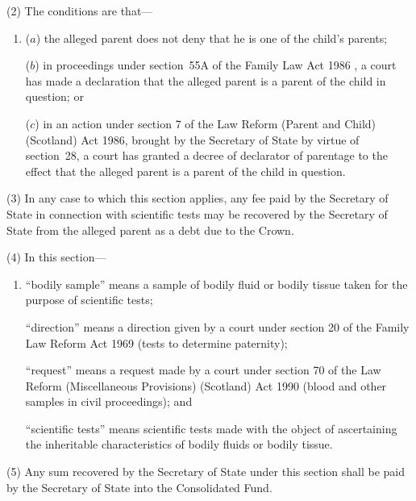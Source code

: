 \documentclass[12pt,a4paper]{article}
\begin{document}
(2) The conditions are that—
\begin{enumerate}\item[]
($a$) the alleged parent does not deny that he is one of the child’s parents;

($b$) in proceedings under 
section~55A of the Family Law Act 1986%
, a court has made a declaration that the alleged parent is a parent of the child in question; or

($c$) in an action under section 7 of the Law Reform (Parent and Child) (Scotland) Act 1986, brought by the 
Secretary of State  %
by virtue of section~28, a court has granted a decree of declarator of parentage to the effect that the alleged parent is a parent of the child in question.
\end{enumerate}

(3) In any case to which this section applies, any fee paid by the 
Secretary of State  %
in connection with scientific tests may be recovered by 
the Secretary of State  %
from the alleged parent as a debt due to the Crown.

(4) In this section—
\begin{enumerate}\item[]
“bodily sample” means a sample of bodily fluid or bodily tissue taken for the purpose of scientific tests;

“direction” means a direction given by a court under section 20 of the Family Law Reform Act 1969 (tests to determine paternity);

“request” means a request made by a court under section 70 of the Law Reform (Miscellaneous Provisions) (Scotland) Act 1990 (blood and other samples in civil proceedings); and

“scientific tests” means scientific tests made with the object of ascertaining the inheritable characteristics of bodily fluids or bodily tissue.
\end{enumerate}

(5) Any sum recovered by the 
Secretary of State  %
under this section shall be paid by 
the Secretary of State  %
into the Consolidated Fund.
\end{document}
